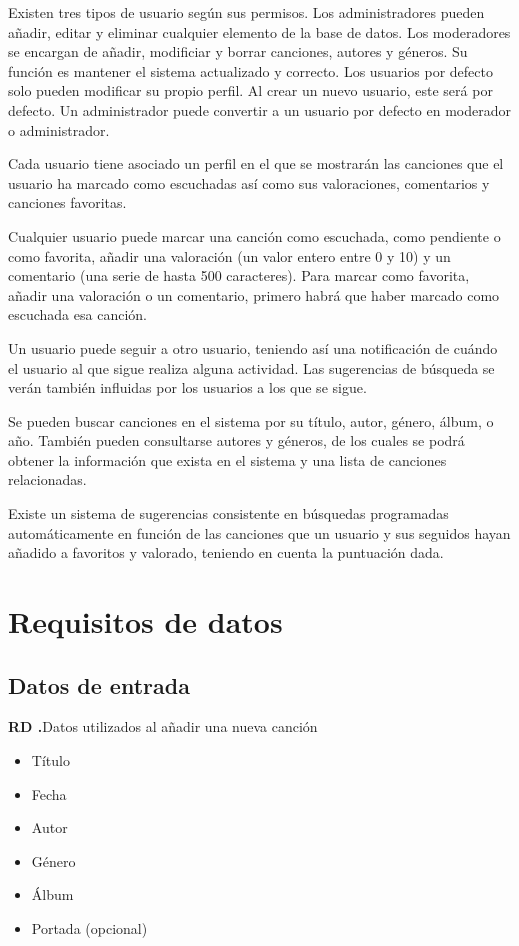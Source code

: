 \documentclass[
  12pt,
  a4paper,
  DIV=12,
  spanish,
]{scrartcl}
\newcounter{RD}
\newcounter{RDu}
\renewcommand{\theRDu}{\theRD.\arabic{RDu}}
\newcommand{\rdu}[1]{\noindent%
  \refstepcounter{RDu}\textbf{RD \theRDu}\quad #1\\%
}
\begin{document}
Existen tres tipos de usuario según sus permisos. Los administradores pueden añadir, editar y eliminar cualquier elemento de la base de datos. Los moderadores se encargan de añadir, modificiar y borrar canciones, autores y géneros. Su función es mantener el sistema actualizado y correcto. Los usuarios por defecto solo pueden modificar su propio perfil. Al crear un nuevo usuario, este será por defecto. Un administrador puede convertir a un usuario por defecto en moderador o administrador.

Cada usuario tiene asociado un perfil en el que se mostrarán las canciones que el usuario ha marcado como escuchadas así como sus valoraciones, comentarios y canciones favoritas.


Cualquier usuario puede marcar una canción como escuchada, como pendiente o como favorita, añadir una valoración (un valor entero entre 0 y 10) y un comentario (una serie de hasta 500 caracteres). Para marcar como favorita, añadir una valoración o un comentario, primero habrá que haber marcado como escuchada esa canción.

Un usuario puede seguir a otro usuario, teniendo así una notificación de cuándo el usuario al que sigue realiza alguna actividad. Las sugerencias de búsqueda se verán también influidas por los usuarios a los que se sigue.



Se pueden buscar canciones en el sistema por su título, autor, género, álbum, o año. También pueden consultarse autores y géneros, de los cuales se podrá obtener la información que exista en el sistema y una lista de canciones relacionadas.

Existe un sistema de sugerencias consistente en búsquedas programadas automáticamente en función de las canciones que un usuario y sus seguidos hayan añadido a favoritos y valorado, teniendo en cuenta la puntuación dada.

\section{Requisitos de datos}
\subsection{Datos de entrada}


\rdu{Datos utilizados al añadir una nueva canción \label{rdu:datos-nueva-cancion}}
\begin{itemize}
  \item Título
  \item Fecha
  \item Autor
  \item Género
  \item Álbum
  \item Portada (opcional)
\end{itemize}
\end{document}
